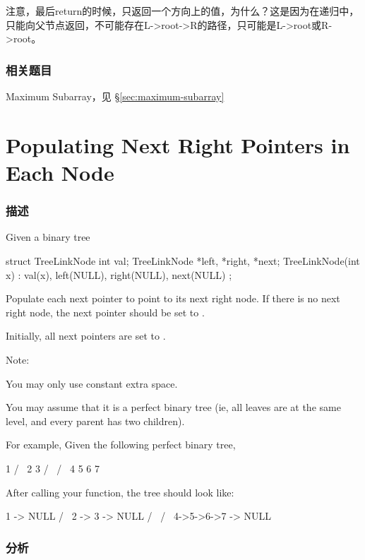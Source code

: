 注意，最后return的时候，只返回一个方向上的值，为什么？这是因为在递归中，只能向父节点返回，不可能存在L->root->R的路径，只可能是L->root或R->root。


\subsubsection{相关题目}
\begindot
\item Maximum Subarray，见 \S \ref{sec:maximum-subarray}
\myenddot


\section{Populating Next Right Pointers in Each Node} %
\label{sec:populating-next-right-pointers-in-each-node}


\subsubsection{描述}
Given a binary tree
\begin{Code}
struct TreeLinkNode {
   int val;
   TreeLinkNode *left, *right, *next;
   TreeLinkNode(int x) : val(x), left(NULL), right(NULL), next(NULL) {}
};
\end{Code}

Populate each next pointer to point to its next right node. If there is no next right node, the next pointer should be set to .

Initially, all next pointers are set to .

Note:
\begindot
\item You may only use constant extra space.
\item You may assume that it is a perfect binary tree (ie, all leaves are at the same level, and every parent has two children).
\myenddot

For example,
Given the following perfect binary tree,
\begin{Code}
         1
       /  \
      2    3
     / \  / \
    4  5  6  7
\end{Code}

After calling your function, the tree should look like:
\begin{Code}
         1 -> NULL
       /  \
      2 -> 3 -> NULL
     / \  / \
    4->5->6->7 -> NULL
\end{Code}


\subsubsection{分析}


